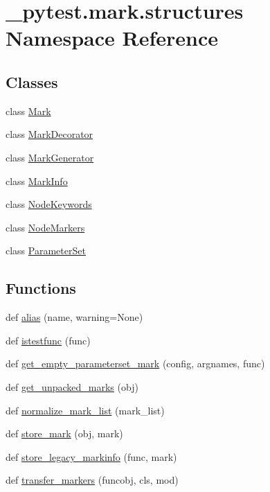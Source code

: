 \hypertarget{namespace__pytest_1_1mark_1_1structures}{}\section{\+\_\+pytest.\+mark.\+structures Namespace Reference}
\label{namespace__pytest_1_1mark_1_1structures}
\subsection*{Classes}
\begin{DoxyCompactItemize}
\item 
class \hyperlink{class__pytest_1_1mark_1_1structures_1_1_mark}{Mark}
\item 
class \hyperlink{class__pytest_1_1mark_1_1structures_1_1_mark_decorator}{Mark\+Decorator}
\item 
class \hyperlink{class__pytest_1_1mark_1_1structures_1_1_mark_generator}{Mark\+Generator}
\item 
class \hyperlink{class__pytest_1_1mark_1_1structures_1_1_mark_info}{Mark\+Info}
\item 
class \hyperlink{class__pytest_1_1mark_1_1structures_1_1_node_keywords}{Node\+Keywords}
\item 
class \hyperlink{class__pytest_1_1mark_1_1structures_1_1_node_markers}{Node\+Markers}
\item 
class \hyperlink{class__pytest_1_1mark_1_1structures_1_1_parameter_set}{Parameter\+Set}
\end{DoxyCompactItemize}
\subsection*{Functions}
\begin{DoxyCompactItemize}
\item 
def \hyperlink{namespace__pytest_1_1mark_1_1structures_ad83334f8dce602c786ff6ae0a632e052}{alias} (name, warning=None)
\item 
def \hyperlink{namespace__pytest_1_1mark_1_1structures_ab85511e5396ed7ee3f6e6c66b3160003}{istestfunc} (func)
\item 
def \hyperlink{namespace__pytest_1_1mark_1_1structures_aa466544284120d2f2e22b14dea034266}{get\+\_\+empty\+\_\+parameterset\+\_\+mark} (config, argnames, func)
\item 
def \hyperlink{namespace__pytest_1_1mark_1_1structures_ae00efe30518135a912d3387e0fa3ac5a}{get\+\_\+unpacked\+\_\+marks} (obj)
\item 
def \hyperlink{namespace__pytest_1_1mark_1_1structures_af9d26652ce297ee74dfeea5d616eb5d9}{normalize\+\_\+mark\+\_\+list} (mark\+\_\+list)
\item 
def \hyperlink{namespace__pytest_1_1mark_1_1structures_a340a55efbd8c6ef26e78dc1f05b5790e}{store\+\_\+mark} (obj, mark)
\item 
def \hyperlink{namespace__pytest_1_1mark_1_1structures_ade88ff32dd0d753e2f85c33874ce2524}{store\+\_\+legacy\+\_\+markinfo} (func, mark)
\item 
def \hyperlink{namespace__pytest_1_1mark_1_1structures_a441e941805d75e4a078a3345b94ba836}{transfer\+\_\+markers} (funcobj, cls, mod)
\end{DoxyCompactItemize}
